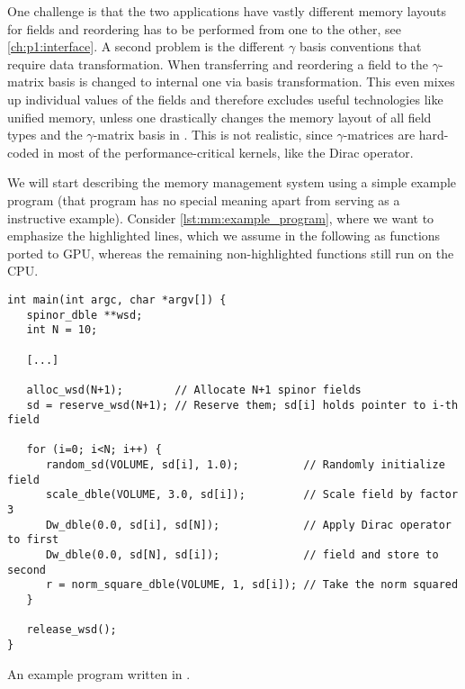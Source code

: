 One challenge is that the two applications have vastly different memory layouts for fields and reordering has to be performed from one to the other, see \cref{ch:p1:interface}.
A second problem is the different $\gamma$ basis conventions that require data transformation.
When transferring and reordering a field to \quda the $\gamma$-matrix basis is changed to \qudas internal one via basis transformation.
This even mixes up individual values of the fields and therefore excludes useful technologies like unified memory, unless one drastically changes the memory layout of all field types and the $\gamma$-matrix basis in \openqxd.
This is not realistic, since $\gamma$-matrices are hard-coded in most of the performance-critical kernels, like the Dirac operator.

We will start describing the memory management system using a simple example program (that program has no special meaning apart from serving as a instructive example).
Consider \cref{lst:mm:example_program}, where we want to emphasize the highlighted lines, which we assume in the following as functions ported to GPU, whereas the remaining non-highlighted functions still run on the CPU.
\begin{codelisting}
\begin{verbatim}
int main(int argc, char *argv[]) {
   spinor_dble **wsd;
   int N = 10;

   [...]

   alloc_wsd(N+1);        // Allocate N+1 spinor fields
   sd = reserve_wsd(N+1); // Reserve them; sd[i] holds pointer to i-th field

   for (i=0; i<N; i++) {
      random_sd(VOLUME, sd[i], 1.0);          // Randomly initialize field
      scale_dble(VOLUME, 3.0, sd[i]);         // Scale field by factor 3
      Dw_dble(0.0, sd[i], sd[N]);             // Apply Dirac operator to first
      Dw_dble(0.0, sd[N], sd[i]);             // field and store to second
      r = norm_square_dble(VOLUME, 1, sd[i]); // Take the norm squared
   }

   release_wsd();
}
\end{verbatim}
\caption{An example program written in \openqxd.}
\label{lst:mm:example_program}
\end{codelisting}

